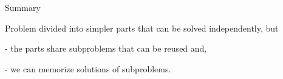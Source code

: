 \begin{frame}{Summary}


\vspace{40pt}\hspace{80pt}\parbox[l][60pt][l]{240pt}{Problem divided into simpler parts that can be solved independently, but

\vspace{10pt}\pause
-  the parts share subproblems that can be reused and,

\vspace{10pt}\pause
-  we can memorize solutions of subproblems.
}

\end{frame}

